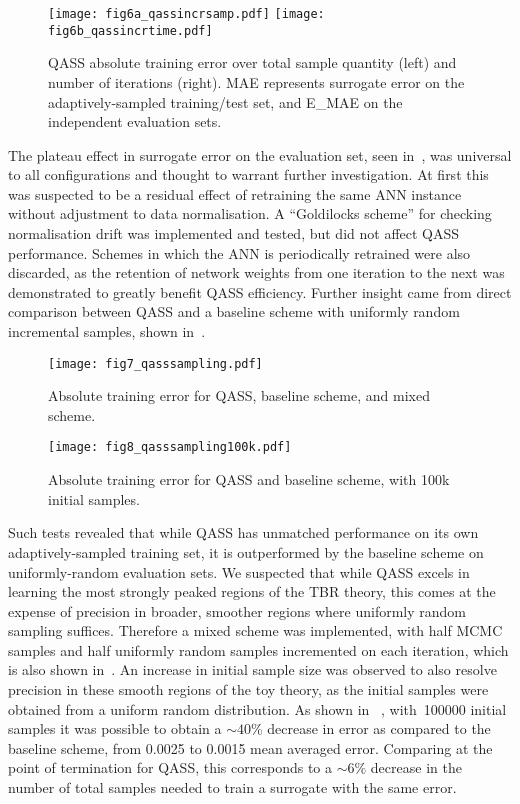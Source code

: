 \begin{figure}
	\centering
	\texttt{[image: fig6a\_qassincrsamp.pdf]}
	\texttt{[image: fig6b\_qassincrtime.pdf]}
    \caption{QASS absolute training error over total sample quantity (left) and number of iterations (right). MAE represents surrogate error on the adaptively-sampled training/test set, and E\_MAE on the independent evaluation sets.}
    \label{fig:qassincr}
\end{figure}

The plateau effect in surrogate error on the evaluation set, seen
in~, was universal to all configurations and thought to
warrant further investigation. At first this was suspected to be a residual
effect of retraining the same ANN instance without adjustment to data
normalisation. A ``Goldilocks scheme'' for checking normalisation drift was
implemented and tested, but did not affect QASS performance. Schemes in which
the ANN is periodically retrained were also discarded, as the retention of
network weights from one iteration to the next was demonstrated to greatly
benefit QASS efficiency. Further insight came from direct comparison between
QASS and a baseline scheme with uniformly random incremental samples, shown
in~.

\begin{figure}
	\centering
	\texttt{[image: fig7\_qasssampling.pdf]}
	\caption{\label{fig:qasssampling}Absolute training error for QASS, baseline scheme, and mixed scheme.}
\end{figure}

\begin{figure}
	\centering
	\texttt{[image: fig8\_qasssampling100k.pdf]}
	\caption{\label{fig:qasssampling100k}Absolute training error for QASS and baseline scheme, with 100k initial samples.}
\end{figure}

Such tests revealed that while QASS has unmatched performance on its own
adaptively-sampled training set, it is outperformed by the baseline scheme on
uniformly-random evaluation sets. We suspected that while QASS excels in
learning the most strongly peaked regions of the TBR theory, this comes at the
expense of precision in broader, smoother regions where uniformly random
sampling suffices. Therefore a mixed scheme was implemented, with half MCMC
samples and half uniformly random samples incremented on each iteration, which
is also shown in~. An increase in initial sample size was
observed to also resolve precision in these smooth regions of the toy theory, as
the initial samples were obtained from a uniform random distribution. As shown
in ~, with~\num{100000} initial samples it was
possible to obtain a ${\sim}40\%$ decrease in error as compared to the baseline
scheme, from 0.0025 to 0.0015 mean averaged error. Comparing at the point of
termination for QASS, this corresponds to a ${\sim}6\%$ decrease in the number
of total samples needed to train a surrogate with the same error. 


